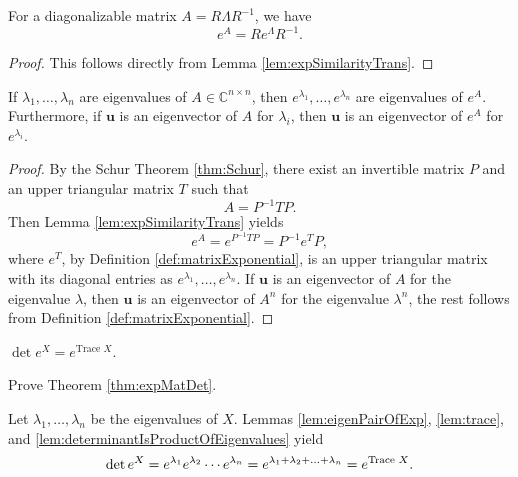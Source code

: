 \begin{coro}
  \label{coro:diagonalMatrixExp}
  For a diagonalizable matrix $A=R \Lambda R^{-1}$, we have
  \begin{equation}
    \label{eq:diagonalMatrixExp}
    e^A = R e^{\Lambda} R^{-1}.
  \end{equation}
\end{coro}
\begin{proof}
  This follows directly from Lemma \ref{lem:expSimilarityTrans}.
\end{proof}

\begin{lem}
  \label{lem:eigenPairOfExp}  
  If $\lambda_1, \ldots, \lambda_n$ are eigenvalues of
  $A\in \mathbb{C}^{n\times n}$,
  then $e^{\lambda_1}, \ldots, e^{\lambda_n}$
  are eigenvalues of $e^A$.
  Furthermore, if $\mathbf{u}$ is an eigenvector
  of $A$ for $\lambda_i$,
  then $\mathbf{u}$ is an eigenvector
  of $e^A$ for $e^{\lambda_i}$.
\end{lem}
\begin{proof}
  By the Schur Theorem \ref{thm:Schur},
  there exist an invertible matrix $P$
  and an upper triangular matrix $T$ such that
  \begin{displaymath}
    A = P^{-1} T P.
  \end{displaymath}
  Then Lemma \ref{lem:expSimilarityTrans}
  yields
  \begin{displaymath}
    e^A = e^{P^{-1} T P} = P^{-1} e^{T} P,  
  \end{displaymath}
  where $e^T$, by Definition \ref{def:matrixExponential},
  is an upper triangular matrix with
  its diagonal entries as
  $e^{\lambda_1}, \ldots, e^{\lambda_n}$.
  If $\mathbf{u}$ is an eigenvector
  of $A$ for the eigenvalue $\lambda$,
  then $\mathbf{u}$ is an eigenvector
  of $A^n$ for the eigenvalue $\lambda^n$, 
  the rest follows from Definition \ref{def:matrixExponential}. 
\end{proof}

\begin{thm}
  \label{thm:expMatDet}
  $\det e^X = e^{\text{Trace } X}$.
\end{thm}

\begin{exc}
  Prove Theorem \ref{thm:expMatDet}.
\end{exc}
\begin{solution}
  Let $\lambda_1, \ldots, \lambda_n$
  be the eigenvalues of $X$. 
  Lemmas \ref{lem:eigenPairOfExp},
  \ref{lem:trace},
  and \ref{lem:determinantIsProductOfEigenvalues} yield
  \begin{displaymath}
    \det e^X = e^{\lambda_1} e^{\lambda_2}\cdots e^{\lambda_n}
    = e^{\lambda_1+\lambda_2+\ldots+\lambda_n} = e^{\text{Trace } X}. 
    \qedhere
  \end{displaymath}
\end{solution}


